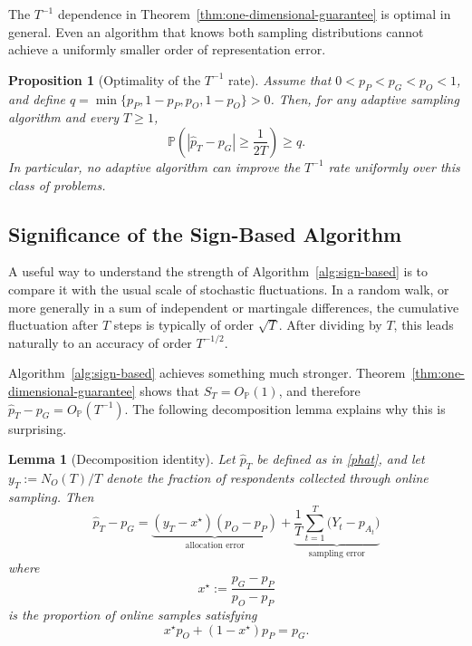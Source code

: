 \documentclass[twoside]{article}
\newtheorem{lemma}{Lemma}
\newtheorem{proposition}{Proposition}
\begin{document}
The \(T^{-1}\) dependence in Theorem~\ref{thm:one-dimensional-guarantee}
is optimal in general. Even an algorithm that knows both sampling
distributions cannot achieve a uniformly smaller order of representation
error.

\begin{proposition}[Optimality of the \(T^{-1}\) rate]
\label{prop:one-dimensional-lower-bound}
Assume that $0<p_P<p_G<p_O<1$, and define $q=\min\{p_P,1-p_P,p_O,1-p_O\}>0$. 
Then, for any adaptive sampling algorithm and every \(T\geq1\),
\[
\mathbb P\left(
\left|\widehat p_T-p_G\right|
\geq \frac{1}{2T}
\right)
\geq q.
\]
In particular, no adaptive algorithm can improve the
\(T^{-1}\) rate uniformly over this class of problems.
\end{proposition}

\subsection{Significance of the Sign-Based Algorithm}

A useful way to understand the strength of Algorithm~\ref{alg:sign-based}
is to compare it with the usual scale of stochastic fluctuations. In a random
walk, or more generally in a sum of independent or martingale differences, the
cumulative fluctuation after \(T\) steps is typically of order \(\sqrt T\).
After dividing by \(T\), this leads naturally to an accuracy of order
\(T^{-1/2}\).

Algorithm~\ref{alg:sign-based} achieves something much stronger.
Theorem~\ref{thm:one-dimensional-guarantee} shows that $S_T=O_{\mathbb P}(1)$, 
and therefore $\widehat p_T-p_G=O_{\mathbb P}(T^{-1})$. 
The following decomposition lemma explains why this is surprising.

\begin{lemma}[Decomposition identity]
\label{lem:representation-decomposition}
Let \(\widehat p_T\) be defined as in \eqref{phat}, and let $y_T:=N_O(T)/T$ 
denote the fraction of respondents collected through online sampling. Then
\begin{equation*}
\widehat p_T-p_G
=
\underbrace{
(y_T-x^\star)(p_O-p_P)
}_{\text{allocation error}}
+
\underbrace{
\frac{1}{T}\sum_{t=1}^T
\bigl(Y_t-p_{A_t}\bigr)
}_{\text{sampling error}}
\end{equation*}where
\[
x^\star
:=
\frac{p_G-p_P}{p_O-p_P}
\]
is the proportion of online samples satisfying
\[
x^\star p_O+(1-x^\star)p_P=p_G.
\]
\end{lemma}
\end{document}
